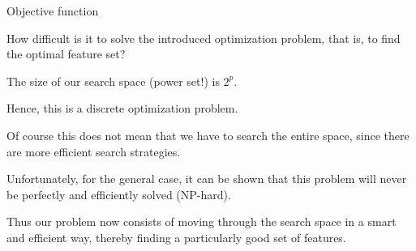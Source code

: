 \begin{vbframe}{Objective function}
\begin{blocki}{How difficult is it to solve the introduced optimization problem, that is, to find the optimal feature set?}
  \item The size of our search space (power set!) is $2^p$.
  \item Hence, this is a discrete optimization problem.
  \item Of course this does not mean that we have to search the entire space, since there are more efficient search strategies.
  \item Unfortunately, for the general case, it can be shown that this problem will never be perfectly and efficiently solved (NP-hard).
% 
% 
% 
  \item Thus our problem now consists of moving through the search space in a smart and efficient way, thereby finding a particularly good set of features.
\end{blocki}
\end{vbframe}

